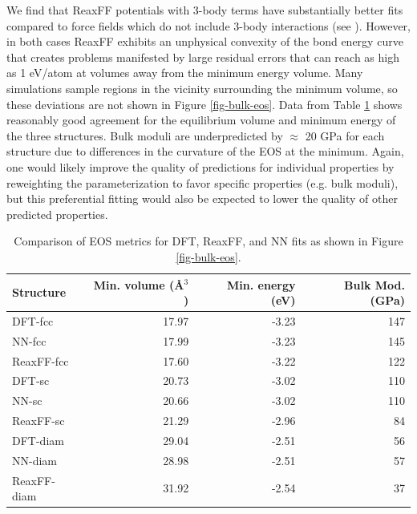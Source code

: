 \documentclass[12pt]{cmuthesis}
\begin{document}
We find that ReaxFF potentials with 3-body terms have substantially better fits compared to force fields which do not include 3-body interactions (see \cite{keith-2010-react-forcef}). However, in both cases ReaxFF exhibits an unphysical convexity of the bond energy curve that creates problems manifested by large residual errors that can reach as high as \textpm{} 1 eV/atom at volumes away from the minimum energy volume. Many simulations sample regions in the vicinity surrounding the minimum volume, so these deviations are not shown in Figure \ref{fig-bulk-eos}. Data from Table \ref{tbl-eos} shows reasonably good agreement for the equilibrium volume and minimum energy of the three structures. Bulk moduli are underpredicted by \(\approx\) 20 GPa for each structure due to differences in the curvature of the EOS at the minimum. Again, one would likely improve the quality of predictions for individual properties by reweighting the parameterization to favor specific properties (e.g. bulk moduli), but this preferential fitting would also be expected to lower the quality of other predicted properties.

\begin{table}[h]
\caption{\label{tbl-eos}
Comparison of EOS metrics for DFT, ReaxFF, and NN fits as shown in Figure \ref{fig-bulk-eos}.}
\centering
\begin{tabular}{lrrr}
Structure & Min. volume (\AA{}\(^{\text{3}}\)) & Min. energy (eV) & Bulk Mod. (GPa)\\
\hline
DFT-fcc & 17.97 & -3.23 & 147\\
NN-fcc & 17.99 & -3.23 & 145\\
ReaxFF-fcc & 17.60 & -3.22 & 122\\
\hline
DFT-sc & 20.73 & -3.02 & 110\\
NN-sc & 20.66 & -3.02 & 110\\
ReaxFF-sc & 21.29 & -2.96 & 84\\
\hline
DFT-diam & 29.04 & -2.51 & 56\\
NN-diam & 28.98 & -2.51 & 57\\
ReaxFF-diam & 31.92 & -2.54 & 37\\
\hline
\end{tabular}
\end{table}
\end{document}
